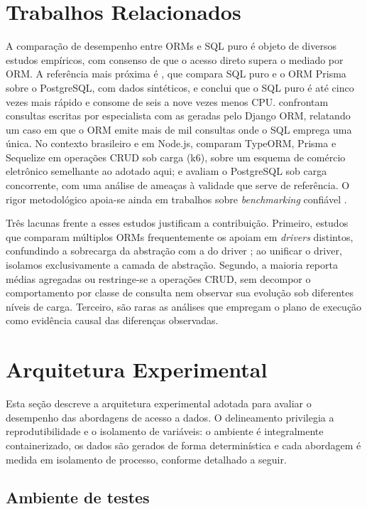 \documentclass[12pt]{article}
\begin{document}
\section{Trabalhos Relacionados}

A comparação de desempenho entre ORMs e SQL puro é objeto de diversos
estudos empíricos, com consenso de que o acesso direto supera o mediado
por ORM. A referência mais próxima é \cite{yusmita2025}, que compara SQL
puro e o ORM Prisma sobre o PostgreSQL, com dados sintéticos, e conclui
que o SQL puro é até cinco vezes mais rápido e consome de seis a nove
vezes menos CPU. \cite{colley2020} confrontam consultas escritas por
especialista com as geradas pelo Django ORM, relatando um caso em que o
ORM emite mais de mil consultas onde o SQL emprega uma única. No contexto
brasileiro e em Node.js, \cite{oliveira2024} comparam TypeORM, Prisma e
Sequelize em operações CRUD sob carga (k6), sobre um esquema de comércio
eletrônico semelhante ao adotado aqui; e \cite{couto2022} avaliam o
PostgreSQL sob carga concorrente, com uma análise de ameaças à validade
que serve de referência. O rigor metodológico apoia-se ainda em trabalhos
sobre \textit{benchmarking} confiável
\cite{kalibera2013,beyer2017,hasselbring2021}.

Três lacunas frente a esses estudos justificam a contribuição. Primeiro,
estudos que
comparam múltiplos ORMs frequentemente os apoiam em \textit{drivers}
distintos, confundindo a sobrecarga da abstração com a do driver
\cite{oliveira2024}; ao unificar o driver, isolamos exclusivamente a
camada de abstração. Segundo, a maioria reporta médias agregadas ou
restringe-se a operações CRUD, sem decompor o comportamento por classe
de consulta nem observar sua evolução sob diferentes níveis de carga.
Terceiro, são raras as análises que empregam o plano de execução como
evidência causal das diferenças observadas.

\section{Arquitetura Experimental}

Esta seção descreve a arquitetura experimental adotada para avaliar o
desempenho das abordagens de acesso a dados. O delineamento privilegia a
reprodutibilidade e o isolamento de variáveis: o ambiente é integralmente
containerizado, os dados são gerados de forma determinística e cada
abordagem é medida em isolamento de processo, conforme detalhado a
seguir.

\subsection{Ambiente de testes}
\end{document}
